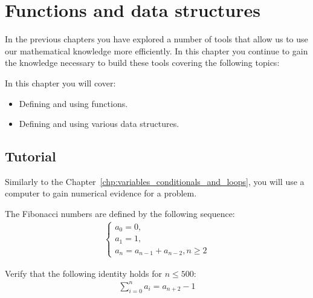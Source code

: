 \chapter{Functions and data structures}
\label{chp:functions_and_data_structures}

In the previous chapters you have explored a number of tools that allow us to use
our mathematical knowledge more efficiently. In this chapter you 
continue to gain the knowledge necessary to build these tools covering the
following topics:



\begin{note}
In this chapter you will cover:
\begin{itemize}
\item 

Defining and using functions.

\item 

Defining and using various data structures.

\end{itemize}
\end{note}





\section{Tutorial}

Similarly to the Chapter~\ref{chp:variables_conditionals_and_loops}, you will use a computer to gain numerical
evidence for a problem.

The Fibonacci numbers are defined by the following sequence:
\begin{equation*}
\begin{split}
\left\{\begin{array}{l}
    a_0 = 0,\\
    a_1 = 1,\\
    a_n = a_{n - 1} + a_{n - 2}, n \geq 2\end{array}\right.
\end{split}
\end{equation*}

Verify that the following identity holds for \(n\leq 500\):
\begin{equation*}
\begin{split}
    \sum_{i=0}^n a_i = a_{n + 2} - 1
\end{split}
\end{equation*}


